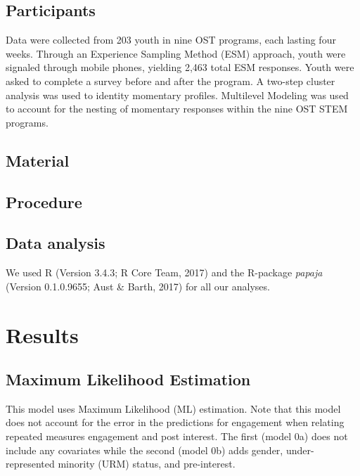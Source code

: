 \documentclass[man]{apa6}
\theoremstyle{definition}
\theoremstyle{definition}
\theoremstyle{definition}
\theoremstyle{remark}
\begin{document}
\subsection{Participants}\label{participants}

Data were collected from 203 youth in nine OST programs, each lasting
four weeks. Through an Experience Sampling Method (ESM) approach, youth
were signaled through mobile phones, yielding 2,463 total ESM responses.
Youth were asked to complete a survey before and after the program. A
two-step cluster analysis was used to identity momentary profiles.
Multilevel Modeling was used to account for the nesting of momentary
responses within the nine OST STEM programs.

\subsection{Material}\label{material}

\subsection{Procedure}\label{procedure}

\subsection{Data analysis}\label{data-analysis}

We used R (Version 3.4.3; R Core Team, 2017) and the R-package
\emph{papaja} (Version 0.1.0.9655; Aust \& Barth, 2017) for all our
analyses.

\section{Results}\label{results}

\subsection{Maximum Likelihood
Estimation}\label{maximum-likelihood-estimation}

This model uses Maximum Likelihood (ML) estimation. Note that this model
does not account for the error in the predictions for engagement when
relating repeated measures engagement and post interest. The first
(model 0a) does not include any covariates while the second (model 0b)
adds gender, under-represented minority (URM) status, and pre-interest.
\end{document}
